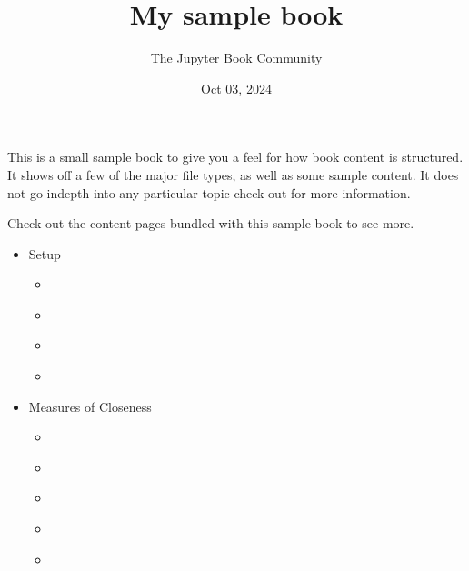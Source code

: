 \documentclass[letterpaper,10pt,english]{jupyterBook}
\title{My sample book}
\date{Oct 03, 2024}
\author{The Jupyter Book Community}
\begin{document}
\pagestyle{empty}
\sphinxmaketitle
\pagestyle{plain}
\sphinxtableofcontents
\pagestyle{normal}
\label{\detokenize{intro::doc}}


\sphinxAtStartPar
This is a small sample book to give you a feel for how book content is
structured.
It shows off a few of the major file types, as well as some sample content.
It does not go in\sphinxhyphen{}depth into any particular topic \sphinxhyphen{} check out  for more information.

\sphinxAtStartPar
Check out the content pages bundled with this sample book to see more.
\begin{itemize}
\item {} 
\sphinxAtStartPar
Setup

\begin{itemize}
\item {} 
\sphinxAtStartPar
{\hyperref[\detokenize{lessons/hw01::doc}]{}}

\item {} 
\sphinxAtStartPar
{\hyperref[\detokenize{lessons/hw02::doc}]{}}

\item {} 
\sphinxAtStartPar
{\hyperref[\detokenize{lessons/wsl::doc}]{}}

\item {} 
\sphinxAtStartPar
{\hyperref[\detokenize{lessons/cw03::doc}]{}}

\end{itemize}
\end{itemize}
\begin{itemize}
\item {} 
\sphinxAtStartPar
Measures of Closeness

\begin{itemize}
\item {} 
\sphinxAtStartPar
{\hyperref[\detokenize{lessons/Bayes_Theorem_Student::doc}]{}}

\item {} 
\sphinxAtStartPar
{\hyperref[\detokenize{lessons/jupyter-python-intro::doc}]{}}

\item {} 
\sphinxAtStartPar
{\hyperref[\detokenize{lessons/Linear_regression_derivation::doc}]{}}

\item {} 
\sphinxAtStartPar
{\hyperref[\detokenize{lessons/least-squares-01::doc}]{}}

\item {} 
\sphinxAtStartPar
{\hyperref[\detokenize{lessons/Correlation_Coefficient::doc}]{}}

\end{itemize}
\end{itemize}
\end{document}

